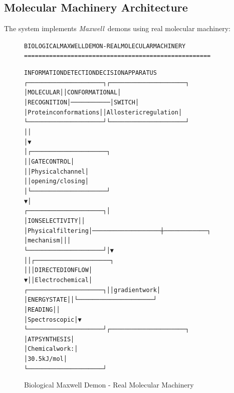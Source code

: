 \documentclass[11pt,a4paper]{article}
\newenvironment{asciiart}{\begin{alltt}}{\end{alltt}}
\newcommand{\maxwell}{\textit{Maxwell}}
\begin{document}
\subsection{Molecular Machinery Architecture}

The system implements \maxwell\ demons using real molecular machinery:

\begin{figure}[H]
\centering
\begin{asciiart}
BIOLOGICAL MAXWELL DEMON - REAL MOLECULAR MACHINERY
====================================================

INFORMATION DETECTION              DECISION APPARATUS
┌─────────────────────┐           ┌─────────────────────┐
│ MOLECULAR           │           │ CONFORMATIONAL      │
│ RECOGNITION         │───────────│ SWITCH              │
│ Protein conformations│           │ Allosteric regulation│
└─────────────────────┘           └─────────────────────┘
         │                                 │
         │                                 ▼
         │                        ┌─────────────────────┐
         │                        │ GATE CONTROL        │
         │                        │ Physical channel    │
         │                        │ opening/closing     │
         │                        └─────────────────────┘
         ▼                                 │
┌─────────────────────┐                   │
│ ION SELECTIVITY     │                   │
│ Physical filtering  │───────────────────┼────────────┐
│ mechanism           │                   │            │
└─────────────────────┘                   │            ▼
         │                                │  ┌─────────────────────┐
         │                                │  │ DIRECTED ION FLOW   │
         ▼                                │  │ Electrochemical     │
┌─────────────────────┐                   │  │ gradient work       │
│ ENERGY STATE        │                   │  └─────────────────────┘
│ READING             │                                │
│ Spectroscopic       │                                ▼
└─────────────────────┘                   ┌─────────────────────┐
                                          │ ATP SYNTHESIS       │
                                          │ Chemical work:      │
                                          │ 30.5 kJ/mol        │
                                          └─────────────────────┘
\end{asciiart}
\caption{Biological Maxwell Demon - Real Molecular Machinery}
\end{figure}
\end{document}
